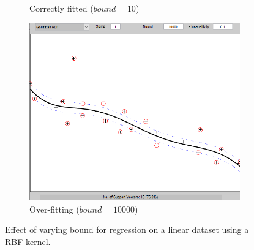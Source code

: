 \documentclass{article}
\begin{document}
\begin{figure}[h]
\begin{subfigure}[b]{0.3\textwidth}
                 \caption{Correctly fitted ($bound=10$)}
                 \label{fig:rbf_medium_bound}
             \end{subfigure}
             \hfill
             \begin{subfigure}[b]{0.3\textwidth}
                 \centering
                 \includegraphics[width=\textwidth]{Assignment 2/figures/1_1/rbf_bound_large.png}
                 \caption{Over-fitting ($bound=10000$)}
                 \label{fig:rbf_large_bound}
             \end{subfigure}
            \caption{Effect of varying bound for regression on a linear dataset using a RBF kernel.}
            \label{fig:bound_effect}
        \end{figure}
        
        
\end{document}
